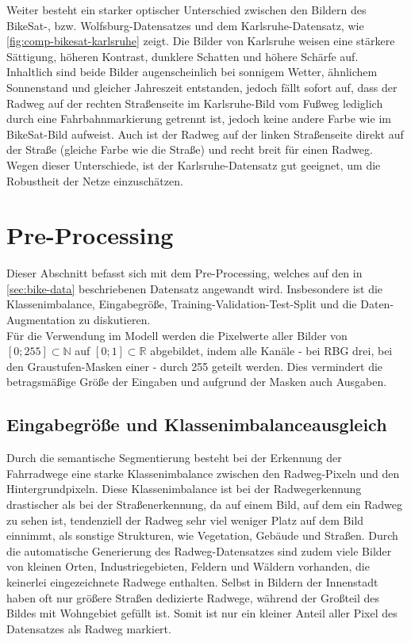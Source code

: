 Weiter besteht ein starker optischer Unterschied zwischen den Bildern des BikeSat-, bzw. Wolfsburg-Datensatzes 
und dem Karlsruhe-Datensatz, wie \autoref{fig:comp-bikesat-karlsruhe} zeigt. Die Bilder von Karlsruhe weisen
eine stärkere Sättigung, höheren Kontrast, dunklere Schatten und höhere Schärfe auf. Inhaltlich sind beide 
Bilder augenscheinlich bei sonnigem Wetter, ähnlichem Sonnenstand und gleicher Jahreszeit entstanden, jedoch 
fällt sofort auf, dass der Radweg auf der rechten Straßenseite im Karlsruhe-Bild vom Fußweg lediglich durch 
eine Fahrbahnmarkierung getrennt ist, jedoch keine andere Farbe wie im BikeSat-Bild aufweist. Auch ist der Radweg auf 
der linken Straßenseite direkt auf der Straße (gleiche Farbe wie die Straße) und recht breit für einen Radweg.   
Wegen dieser Unterschiede, ist der Karlsruhe-Datensatz gut geeignet, um die Robustheit der Netze einzuschätzen. 


\section{Pre-Processing} \label{sec:pre-processing}

Dieser Abschnitt befasst sich mit dem Pre-Processing, welches auf den in \autoref{sec:bike-data} 
beschriebenen Datensatz angewandt wird. Insbesondere ist die Klassenimbalance, Eingabegröße, 
Training-Validation-Test-Split und die Daten-Augmentation zu diskutieren. \\
Für die Verwendung im Modell werden die Pixelwerte aller Bilder von $[0; 255] \subset \mathbb{N}$
auf $[0;1] \subset \mathbb{R}$ abgebildet, indem alle Kanäle - bei RBG drei, bei den Graustufen-Masken einer - durch 255 geteilt werden.
Dies vermindert die betragsmäßige Größe der Eingaben und aufgrund der Masken auch Ausgaben. 

\subsection{Eingabegröße und Klassenimbalanceausgleich}

Durch die semantische Segmentierung besteht bei der Erkennung der Fahrradwege eine starke 
Klassenimbalance zwischen den Radweg-Pixeln und den Hintergrundpixeln. Diese Klassenimbalance ist bei der Radwegerkennung drastischer 
als bei der Straßenerkennung, da auf einem Bild, auf dem ein Radweg zu sehen ist, 
tendenziell der Radweg sehr viel weniger Platz auf dem Bild einnimmt, als sonstige Strukturen, wie Vegetation, Gebäude und Straßen. 
Durch die automatische Generierung des Radweg-Datensatzes sind zudem viele Bilder von kleinen Orten,
Industriegebieten, Feldern und Wäldern vorhanden, die keinerlei eingezeichnete Radwege enthalten. 
Selbst in Bildern der Innenstadt haben oft nur größere Straßen dedizierte Radwege, während der 
Großteil des Bildes mit Wohngebiet gefüllt ist. 
Somit ist nur ein kleiner Anteil aller Pixel des Datensatzes als Radweg markiert. 


